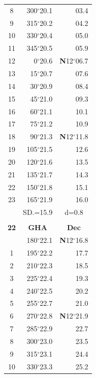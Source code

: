 \documentclass[10pt, a4paper]{report}
\begin{document}
\begin{scriptsize}
\begin{tabular*}{0.2\textwidth}[t]{@{\extracolsep{\fill}}|c|rr|}
8 & 300$^\circ$20.1 & 03.4\\
9 & 315$^\circ$20.2 & \raisebox{0.24ex}{\boldmath$\cdot$~\boldmath$\cdot$~~}04.2\\
10 & 330$^\circ$20.4 & 05.0\\
11 & 345$^\circ$20.5 & 05.9\\[2Pt]
12 & 0$^\circ$20.6 & \textbf{N}12$^\circ$06.7\\
13 & 15$^\circ$20.7 & 07.6\\
14 & 30$^\circ$20.9 & 08.4\\
15 & 45$^\circ$21.0 & \raisebox{0.24ex}{\boldmath$\cdot$~\boldmath$\cdot$~~}09.3\\
16 & 60$^\circ$21.1 & 10.1\\
17 & 75$^\circ$21.2 & 10.9\\[2Pt]
18 & 90$^\circ$21.3 & \textbf{N}12$^\circ$11.8\\
19 & 105$^\circ$21.5 & 12.6\\
20 & 120$^\circ$21.6 & 13.5\\
21 & 135$^\circ$21.7 & \raisebox{0.24ex}{\boldmath$\cdot$~\boldmath$\cdot$~~}14.3\\
22 & 150$^\circ$21.8 & 15.1\\
23 & 165$^\circ$21.9 & 16.0\\
\hline
\rule{0pt}{2.4ex} & \multicolumn{1}{c}{SD.=15.9} & \multicolumn{1}{c|}{d=0.8}\\
\hline
\multicolumn{1}{c}{}\\[-0.5ex]\hline
\multicolumn{1}{|c|}{\rule{0pt}{2.6ex}\textbf{22}} & \multicolumn{1}{c}{\textbf{GHA}} & \multicolumn{1}{c|}{\textbf{Dec}}\\
\hline\rule{0pt}{2.6ex}\noindent
0 & 180$^\circ$22.1 & \textbf{N}12$^\circ$16.8\\
1 & 195$^\circ$22.2 & 17.7\\
2 & 210$^\circ$22.3 & 18.5\\
3 & 225$^\circ$22.4 & \raisebox{0.24ex}{\boldmath$\cdot$~\boldmath$\cdot$~~}19.3\\
4 & 240$^\circ$22.5 & 20.2\\
5 & 255$^\circ$22.7 & 21.0\\[2Pt]
6 & 270$^\circ$22.8 & \textbf{N}12$^\circ$21.9\\
7 & 285$^\circ$22.9 & 22.7\\
8 & 300$^\circ$23.0 & 23.5\\
9 & 315$^\circ$23.1 & \raisebox{0.24ex}{\boldmath$\cdot$~\boldmath$\cdot$~~}24.4\\
10 & 330$^\circ$23.3 & 25.2\\

\end{tabular*}
\end{scriptsize}
\end{document}
